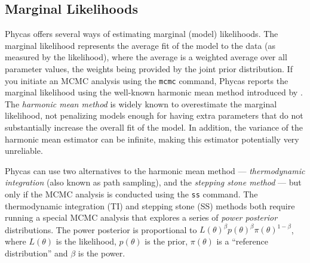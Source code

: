 \documentclass[10pt]{article}
\newcommand{\cmd}[1]{{\tt \small #1}\index{#1}}	%
\begin{document}
\subsection{Marginal Likelihoods} \label{marglike} %
Phycas offers several ways of estimating marginal (model) likelihoods. The marginal likelihood represents the average fit of the model to the data (as measured by the likelihood), where the average is a weighted average over all parameter values, the weights being provided by the joint prior distribution. If you initiate an MCMC analysis using the \cmd{mcmc} command, Phycas reports the marginal likelihood using the well-known harmonic mean method introduced by \citet{NewtonRaftery1994}. The {\em harmonic mean method} is widely known to overestimate the marginal likelihood, not penalizing models enough for having extra parameters that do not substantially increase the overall fit of the model. In addition, the variance of the harmonic mean estimator can be infinite, making this estimator potentially very unreliable.

Phycas can use two alternatives to the harmonic mean method --- {\em thermodynamic integration} \citep{LartillotPhillippe2006} (also known as path sampling), and the {\em stepping stone method} \citep{XieLewisFanKuoChen2010,FanWuChenKuoLewis2010} --- but only if the MCMC analysis is conducted using the \cmd{ss} command. The thermodynamic integration (TI) and stepping stone (SS) methods both require running a special MCMC analysis that explores a series of {\em power posterior} distributions. The power posterior is proportional to $L(\theta)^{\beta} p(\theta)^{\beta} \pi(\theta)^{1-\beta}$, where $L(\theta)$ is the likelihood, $p(\theta)$ is the prior, $\pi(\theta)$ is a ``reference distribution'' and $\beta$ is the power. 
\end{document}
